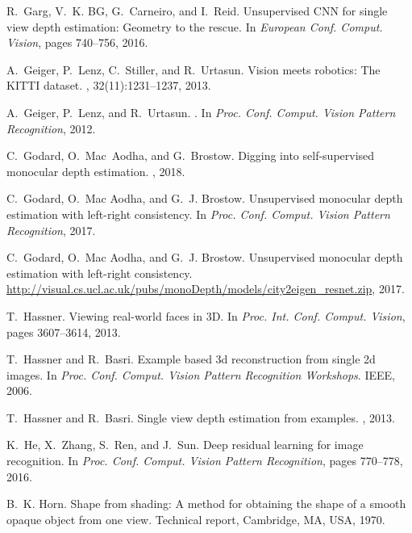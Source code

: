 \documentclass[10pt,twocolumn,letterpaper]{article}
\begin{document}
{\begin{thebibliography}{10}
R.~Garg, V.~K. BG, G.~Carneiro, and I.~Reid.
\newblock Unsupervised {CNN} for single view depth estimation: Geometry to the
  rescue.
\newblock In {\em European Conf. Comput. Vision}, pages 740--756, 2016.

A.~Geiger, P.~Lenz, C.~Stiller, and R.~Urtasun.
\newblock Vision meets robotics: The {KITTI} dataset.
, 32(11):1231--1237, 2013.

A.~Geiger, P.~Lenz, and R.~Urtasun.
.
\newblock In {\em Proc. Conf. Comput. Vision Pattern Recognition}, 2012.

C.~Godard, O.~Mac~Aodha, and G.~Brostow.
\newblock Digging into self-supervised monocular depth estimation.
, 2018.

C.~Godard, O.~{Mac Aodha}, and G.~J. Brostow.
\newblock Unsupervised monocular depth estimation with left-right consistency.
\newblock In {\em Proc. Conf. Comput. Vision Pattern Recognition}, 2017.

C.~Godard, O.~{Mac Aodha}, and G.~J. Brostow.
\newblock Unsupervised monocular depth estimation with left-right consistency.
\newblock
  \url{http://visual.cs.ucl.ac.uk/pubs/monoDepth/models/city2eigen_resnet.zip},
  2017.

T.~Hassner.
\newblock Viewing real-world faces in {3D}.
\newblock In {\em Proc. Int. Conf. Comput. Vision}, pages 3607--3614, 2013.

T.~Hassner and R.~Basri.
\newblock Example based 3d reconstruction from single 2d images.
\newblock In {\em Proc. Conf. Comput. Vision Pattern Recognition Workshops}.
  IEEE, 2006.

T.~Hassner and R.~Basri.
\newblock Single view depth estimation from examples.
, 2013.

K.~He, X.~Zhang, S.~Ren, and J.~Sun.
\newblock Deep residual learning for image recognition.
\newblock In {\em Proc. Conf. Comput. Vision Pattern Recognition}, pages
  770--778, 2016.

B.~K. Horn.
\newblock Shape from shading: A method for obtaining the shape of a smooth
  opaque object from one view.
\newblock Technical report, Cambridge, MA, USA, 1970.


\end{thebibliography}}
\end{document}
